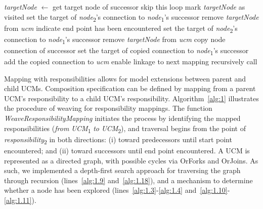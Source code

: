 \begin{algorithm}                     
	\begin{algorithmic}[1]
		
				\State \emph{targetNode} $\gets$ get target node of successor
				 \label{alg:1.10}
					\State skip this loop
					\State mark \emph{targetNode} as visited
				\EndIf \label{alg:1.11}
				 \label{alg:1.12}
						\State set the target of \emph{node}\textsubscript{2}'s connection to \emph{node}\textsubscript{1}'s successor
						\State remove \emph{targetNode} from \emph{ucm}
						\State indicate end point has been encountered
					\EndIf \label{alg:1.13}
				 \label{alg:1.14}
					\State set the target of \emph{node}\textsubscript{2}'s connection to \emph{node}\textsubscript{1}'s successor
						\State remove \emph{targetNode} from \emph{ucm}
					\EndIf \label{alg:1.15}
				 \label{alg:1.16}
					\State copy node connection of successor
					\State set the target of copied connection to \emph{node}\textsubscript{1}'s successor
					\State add the copied connection to \emph{ucm}
					\State enable linkage to next mapping \label{alg:1.17}
				\Else
					\State recursively call  \label{alg:1.18}
				\EndIf
			\EndFor
		\EndFunction
	\end{algorithmic}
\end{algorithm}

Mapping with responsibilities allows for model extensions between parent and child UCMs. Composition specification can be defined by mapping from a parent UCM's responsibility to a child UCM's responsibility. Algorithm~\ref{alg:1} illustrates the procedure of weaving for responsibility mappings. The function \emph{WeaveResponsibilityMapping} initiates the process by identifying the mapped responsibilities (\emph{from} \emph{UCM}\textsubscript{1} \emph{to} \emph{UCM}\textsubscript{2}), and traversal begins from the point of \emph{responsibility}\textsubscript{2} in both directions: (i) toward predecessors until start point encountered; and (ii) toward successors until end point encountered. A UCM is represented as a directed graph, with possible cycles via {\cls OrFork}s and {\cls OrJoin}s. As such, we implemented a depth-first search approach for traversing the graph through recursion (lines~\ref{alg:1.9} and~\ref{alg:1.18}), and a mechanism to determine whether a node has been explored (lines~\ref{alg:1.3}-\ref{alg:1.4} and~\ref{alg:1.10}-\ref{alg:1.11}).

